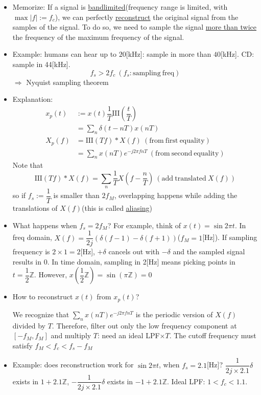 \documentclass{article}
\begin{document}
\begin{itemize}
    \item Memorize: If a signal is \underline{bandlimited}(frequency range is limited, with $\max{|f|}:=f_c$), we can perfectly \underline{reconstruct} the original signal from the samples of the signal. To do so, we need to sample the signal \underline{more than twice} the frequency of the maximum frequency of the signal.
    
    \item Example: humans can hear up to $20$[kHz]: sample in more than $40$[kHz]. CD: sample in 44[kHz].
    \[f_s > 2f_c\:(f_s:\mathrm{sampling\:freq})\]
    $\Rightarrow$ Nyquist sampling theorem
    
    \item Explanation:
    \begin{align*}
    x_p(t)&:=x(t)\dfrac{1}{T}\mathrm{III}\left(\dfrac{t}{T}\right)\\
          &= \sum_n \delta\left(t-nT\right)x(nT)\\
    X_p(f)&= \mathrm{III}(Tf)*X(f)\:(\mathrm{from\:first\:equality})\\
          &= \sum_n x(nT)e^{-j2\pi fnT}\:(\mathrm{from\:second\:equality})
    \end{align*} 
    Note that \[\mathrm{III}(Tf)*X(f)=\sum_n\frac{1}{T}X\left(f-\frac{n}{T}\right)\:(\mathrm{add\:translated\:}X(f))\]
    so if $f_s:=\dfrac{1}{T}$ is smaller than $2f_M$, overlapping happens while adding the translations of $X(f)$(this is called \underline{aliasing})
    
    \item What happens when $f_s=2f_M$? For example, think of $x(t)=\sin{2\pi t}$. In freq domain, $X(f)=\dfrac{1}{2j}(\delta(f-1)-\delta(f+1))$($f_M=1$[Hz]). If sampling frequency is $2\times1 = 2$[Hz], $+\delta$ cancels out with $-\delta$ and the sampled signal results in 0. In time domain, sampling in 2[Hz] means picking points in $t=\dfrac{1}{2}\mathbb{Z}$. However, $x(\dfrac{1}{2}\mathbb{Z})=\sin{(\pi\mathbb{Z})}=0$
    
    \item How to reconstruct $x(t)$ from $x_p(t)$? 
    
    We recognize that $\sum_n x(nT)e^{-j2\pi fnT}$ is the periodic version of $X(f)$ divided by $T$. Therefore, filter out only the low frequency component at $[-f_M,f_M]$ and multiply $T$: need an ideal LPF$\times T$. The cutoff frequency must satisfy $f_M < f_c < f_s-f_M$
    
    \item Example: does reconstruction work for $\sin{2\pi t}$, when $f_s=2.1$[Hz]? $\dfrac{1}{2j\times 2.1}\delta$ exists in $1+2.1\mathbb{Z}$, $-\dfrac{1}{2j\times 2.1}\delta$ exists in $-1+2.1\mathbb{Z}$. Ideal LPF: $1 < f_c < 1.1$.
    

\end{itemize}
\end{document}
